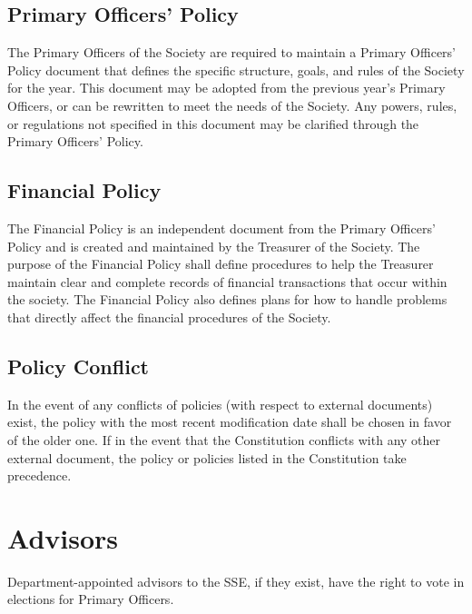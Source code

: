 \documentclass[american]{article}
\begin{document}
\subsection{Primary Officers' Policy}
The Primary Officers of the Society are required to maintain a Primary Officers' Policy document that defines the specific structure, goals, and rules of the Society for the year. This document may be adopted from the previous year's Primary Officers, or can be rewritten to meet the needs of the Society. Any powers, rules, or regulations not specified in this document may be clarified through the Primary Officers' Policy.

\subsection{Financial Policy}
The Financial Policy is an independent document from the Primary Officers' Policy and is created and maintained by the Treasurer of the Society. The purpose of the Financial Policy shall define procedures to help the Treasurer maintain clear and complete records of financial transactions that occur within the society. The Financial Policy also defines plans for how to handle problems that directly affect the financial procedures of the Society.

\subsection{Policy Conflict}
In the event of any conflicts of policies (with respect to external documents) exist, the policy with the most recent modification date shall be chosen in favor of the older one. If in the event that the Constitution conflicts with any other external document, the policy or policies listed in the Constitution take precedence.

\section{Advisors}
Department-appointed advisors to the SSE, if they exist, have the right to vote in elections for Primary Officers.
\end{document}

